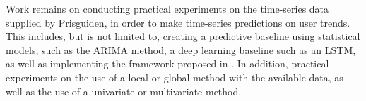 Work remains on conducting practical experiments on the time-series data supplied by Prisguiden,
in order to make time-series predictions on user trends.
This includes, but is not limited to, creating a predictive baseline using statistical models, such as the ARIMA method, a deep learning baseline such as an LSTM,
as well as implementing the framework proposed in .
In addition, practical experiments on the use of a local or global method with the available data,
as well as the use of a univariate or multivariate method.
\fi
